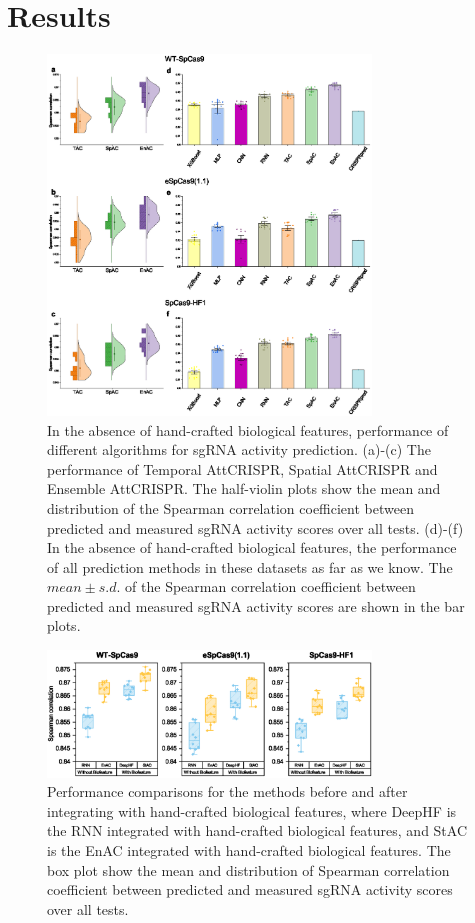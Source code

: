 \documentclass{bioinfo}
\begin{document}
\section{Results}
\begin{figure}[!tpb]
    \centerline{\includegraphics[width=86mm]{baselinewithoutbiofeat.eps}}
    \caption{In the absence of hand-crafted biological features, performance of different algorithms for sgRNA activity prediction. 
    (a)-(c) The performance of Temporal AttCRISPR, Spatial AttCRISPR and Ensemble AttCRISPR. 
    The half-violin plots show the mean and distribution of the Spearman correlation coefficient between predicted and measured sgRNA activity scores over all tests. 
    (d)-(f) In the absence of hand-crafted biological features, the performance of all prediction methods in these datasets as far as we know. 
    The $mean \pm s.d.$ of the Spearman correlation coefficient between predicted and measured sgRNA activity scores are shown in the bar plots.}\label{fig:06}
\end{figure}

\begin{figure}[!tpb]%
    \centerline{\includegraphics[width=86mm]{baselinewithbiofeat.eps}}
    \caption{
Performance comparisons for the methods before and after integrating with hand-crafted biological features, 
where DeepHF is the RNN integrated with hand-crafted biological features, 
and StAC is the EnAC integrated with hand-crafted biological features. 
The box plot show the mean and distribution of Spearman correlation coefficient between predicted and measured sgRNA activity scores over all tests.
}\label{fig:07}
\end{figure}
\end{document}
